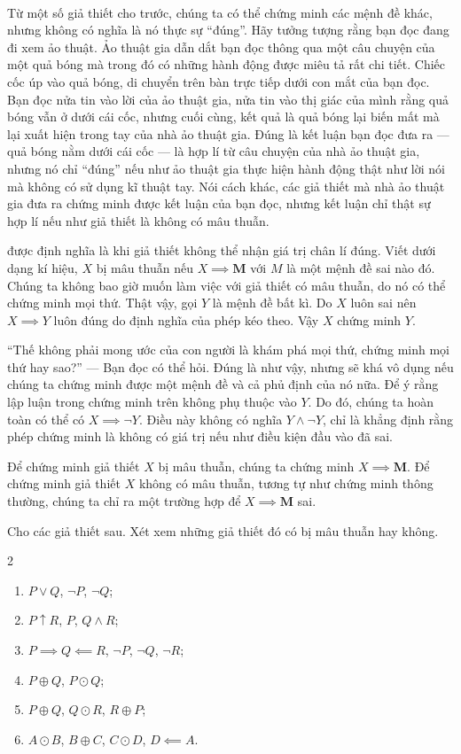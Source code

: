 \ %

Từ một số giả thiết cho trước, chúng ta có thể chứng minh các mệnh đề khác, nhưng không có nghĩa là nó thực sự ``đúng''. Hãy tưởng tượng rằng bạn đọc đang đi xem ảo thuật. Ảo thuật gia dẫn dắt bạn đọc thông qua một câu chuyện của một quả bóng mà trong đó có những hành động được miêu tả rất chi tiết. Chiếc cốc úp vào quả bóng, di chuyển trên bàn trực tiếp dưới con mắt của bạn đọc. Bạn đọc nửa tin vào lời của ảo thuật gia, nửa tin vào thị giác của mình rằng quả bóng vẫn ở dưới cái cốc, nhưng cuối cùng, kết quả là quả bóng lại biến mất mà lại xuất hiện trong tay của nhà ảo thuật gia. Đúng là kết luận bạn đọc đưa ra --- quả bóng nằm dưới cái cốc --- là hợp lí từ câu chuyện của nhà ảo thuật gia, nhưng nó chỉ ``đúng'' nếu như ảo thuật gia thực hiện hành động thật như lời nói mà không có sử dụng kĩ thuật tay. Nói cách khác, các giả thiết mà nhà ảo thuật gia đưa ra chứng minh được kết luận của bạn đọc, nhưng kết luận chỉ thật sự hợp lí nếu như giả thiết là không có mâu thuẫn.

 được định nghĩa là khi giả thiết không thể nhận giá trị chân lí đúng. Viết dưới dạng kí hiệu, $X$ bị mâu thuẫn nếu $X \implies \mathbf{M}$ với $M$ là một mệnh đề sai nào đó. Chúng ta không bao giờ muốn làm việc với giả thiết có mâu thuẫn, do nó có thể chứng minh mọi thứ. Thật vậy, gọi $Y$ là mệnh đề bất kì. Do $X$ luôn sai nên $X \implies Y$ luôn đúng do định nghĩa của phép kéo theo. Vậy $X$ chứng minh $Y$.

``Thế không phải mong ước của con người là khám phá mọi thứ, chứng minh mọi thứ hay sao?'' --- Bạn đọc có thể hỏi. Đúng là như vậy, nhưng sẽ khá vô dụng nếu chúng ta chứng minh được một mệnh đề và cả phủ định của nó nữa. Để ý rằng lập luận trong chứng minh trên không phụ thuộc vào $Y$. Do đó, chúng ta hoàn toàn có thể có $X \implies \neg Y$. Điều này không có nghĩa $Y \land \neg Y$, chỉ là khẳng định rằng phép chứng minh là không có giá trị nếu như điều kiện đầu vào đã sai.

Để chứng minh giả thiết $X$ bị mâu thuẫn, chúng ta chứng minh $X \implies \mathbf{M}$. Để chứng minh giả thiết $X$ không có mâu thuẫn, tương tự như chứng minh thông thường, chúng ta chỉ ra một trường hợp để $X \implies \mathbf{M}$ sai.

\exercise Cho các giả thiết sau. Xét xem những giả thiết đó có bị mâu thuẫn hay không.
\begin{multicols}{2}
    \begin{enumerate}
        \item $P \lor Q$, $\neg P$, $\neg Q$;
        \item $P \uparrow R$, $P$, $Q \land R$;
        \item $P \implies Q \impliedby R$, $\neg P$, $\neg Q$, $\neg R$;
        \item $P \oplus Q$, $P \odot Q$;
        \item $P \oplus Q$, $Q \odot R$, $R \oplus P$;
        \item $A \odot B$, $B \oplus C$, $C \odot D$, $D \impliedby A$.
    \end{enumerate}
\end{multicols}


